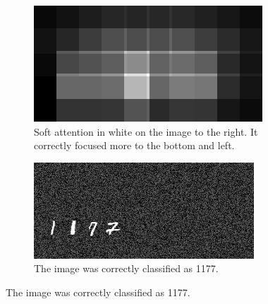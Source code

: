 
\begin{figure}
    \centering
    \begin{subfigure}[c]{0.45\textwidth}
        \centering    \includegraphics[scale=2.0]{resources/MNIST_soft_att/1177_att.jpg}
        \caption{Soft attention in white on the image to the right. It correctly focused more to the bottom and left.}
    \end{subfigure} \quad %
    \begin{subfigure}[c]{0.45\textwidth}
        \centering
        \includegraphics[scale=2.0]{resources/MNIST_soft_att/1177_correct.jpg}
        \caption{The image was correctly classified as 1177.}
    \end{subfigure}
    
    \vspace{1em}
    

\end{figure}
